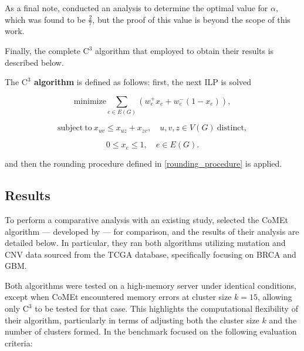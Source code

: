 As a final note, \textcite{c3} conducted an analysis to determine the optimal value for $\alpha$, which was found to be $\frac{2}{7}$, but the proof of this value is beyond the scope of this work.

Finally, the complete $\mathrm{C}^3$ algorithm that \textcite{c3} employed to obtain their results is described below.

\begin{definition}[$\mathrm{C}^3$] \label{c3_final}
    The \textbf{$\mathrm{C}^3$ algorithm} is defined as follows: first, the next ILP is solved

    \begin{equation}
        \mathrm{minimize} \sum_{e \in E(G)} (w_e^+x_e + w_e^-(1 - x_e)),
    \end{equation}

    \begin{equation}
        \mathrm{subject \ to \ } x_{uv} \le x_{uz} + x_{zv}, \quad u, v, z \in V(G) \mathrm{\ distinct},
    \end{equation}

    \begin{equation}
        0 \le x_e \le 1, \quad e \in E(G).
    \end{equation}

    and then the rounding procedure defined in \cref{rounding_procedure} is applied.
\end{definition}

\subsection{Results}

To perform a comparative analysis with an existing study, \textcite{c3} selected the CoMEt algorithm --- developed by \textcite{comet} --- for comparison, and the results of their analysis are detailed below. In particular, they ran both algorithms utilizing mutation and CNV data sourced from the TCGA \cite{tcga} database, specifically focusing on BRCA and GBM.

Both algorithms were tested on a high-memory server under identical conditions, except when CoMEt encountered memory errors at cluster size $k = 15$, allowing only $\mathrm{C}^3$ to be tested for that case. This highlights the computational flexibility of their algorithm, particularly in terms of adjusting both the cluster size $k$ and the number of clusters formed. In the benchmark \textcite{c3} focused on the following evaluation criteria:

